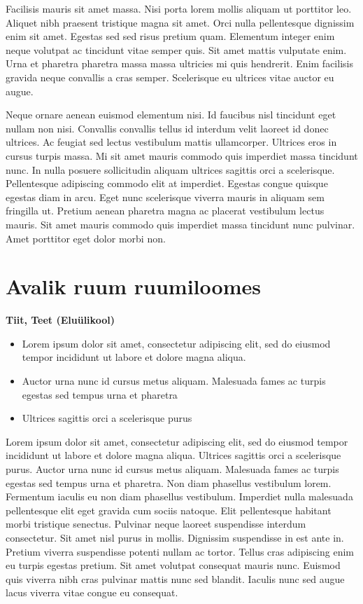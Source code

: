 \documentclass[]{book}
\begin{document}
Facilisis mauris sit amet massa. Nisi porta lorem mollis aliquam ut porttitor leo. Aliquet nibh praesent tristique magna sit amet. Orci nulla pellentesque dignissim enim sit amet. Egestas sed sed risus pretium quam. Elementum integer enim neque volutpat ac tincidunt vitae semper quis. Sit amet mattis vulputate enim. Urna et pharetra pharetra massa massa ultricies mi quis hendrerit. Enim facilisis gravida neque convallis a cras semper. Scelerisque eu ultrices vitae auctor eu augue.

Neque ornare aenean euismod elementum nisi. Id faucibus nisl tincidunt eget nullam non nisi. Convallis convallis tellus id interdum velit laoreet id donec ultrices. Ac feugiat sed lectus vestibulum mattis ullamcorper. Ultrices eros in cursus turpis massa. Mi sit amet mauris commodo quis imperdiet massa tincidunt nunc. In nulla posuere sollicitudin aliquam ultrices sagittis orci a scelerisque. Pellentesque adipiscing commodo elit at imperdiet. Egestas congue quisque egestas diam in arcu. Eget nunc scelerisque viverra mauris in aliquam sem fringilla ut. Pretium aenean pharetra magna ac placerat vestibulum lectus mauris. Sit amet mauris commodo quis imperdiet massa tincidunt nunc pulvinar. Amet porttitor eget dolor morbi non.

\hypertarget{chapter41}{%
\section{Avalik ruum ruumiloomes}\label{chapter41}}

\begin{authors}
\textbf{Tiit, Teet (Eluülikool)}
\end{authors}

\begin{points}
\begin{itemize}
\item
  Lorem ipsum dolor sit amet, consectetur adipiscing elit, sed do
  eiusmod tempor incididunt ut labore et dolore magna aliqua.
\item
  Auctor urna nunc id cursus metus aliquam. Malesuada fames ac turpis
  egestas sed tempus urna et pharetra
\item
  Ultrices sagittis orci a scelerisque purus
\end{itemize}
\end{points}

Lorem ipsum dolor sit amet, consectetur adipiscing elit, sed do eiusmod tempor incididunt ut labore et dolore magna aliqua. Ultrices sagittis orci a scelerisque purus. Auctor urna nunc id cursus metus aliquam. Malesuada fames ac turpis egestas sed tempus urna et pharetra. Non diam phasellus vestibulum lorem. Fermentum iaculis eu non diam phasellus vestibulum. Imperdiet nulla malesuada pellentesque elit eget gravida cum sociis natoque. Elit pellentesque habitant morbi tristique senectus. Pulvinar neque laoreet suspendisse interdum consectetur. Sit amet nisl purus in mollis. Dignissim suspendisse in est ante in. Pretium viverra suspendisse potenti nullam ac tortor. Tellus cras adipiscing enim eu turpis egestas pretium. Sit amet volutpat consequat mauris nunc. Euismod quis viverra nibh cras pulvinar mattis nunc sed blandit. Iaculis nunc sed augue lacus viverra vitae congue eu consequat.
\end{document}

